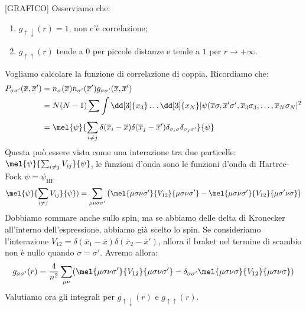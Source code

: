 [GRAFICO]
Osserviamo che:
\begin{enumerate}
    \item $g_{\uparrow\downarrow}(r)=1$, non c'è correlazione;
    \item $g_{\uparrow\uparrow}(r)$ tende a $0$ per piccole distanze e tende a $1$ per $r\rightarrow+\infty$.
\end{enumerate}
Vogliamo calcolare la funzione di correlazione di coppia. Ricordiamo che:
\begin{equation*}
    \begin{aligned}
    P_{\sigma\sigma'}(\overline x, \overline{x}') &= n_\sigma(\overline x)n_{\sigma'}(\overline{x}')g_{\sigma\sigma'}(\overline x, \overline{x}') \\
    & = N(N-1)\sum_{}\int \dd[3]{x_3}\dots\dd[3]{x_N}|\psi(\overline x \sigma, \overline{x}'\sigma', \overline{x}_3\sigma_3,\dots,\overline{x}_N\sigma_N|^2 \\
    & = \mel{\psi}{\sum_{i\neq j}\delta(\overline{x}_i-\overline{x})\delta(\overline{x}_j-\overline{x}')\delta_{\sigma_i\sigma}\delta_{\sigma_j\sigma'}}{\psi}
    \end{aligned}
\end{equation*}
Questa può essere vista come una interazione tra due particelle: $\mel{\psi}{\sum_{i\neq j}V_{ij}}{\psi}$, le funzioni d'onda sono le funzioni d'onda di Hartree-Fock $\psi=\psi_{\text{HF}}$
\begin{equation*}
    \mel{\psi}{\sum_{i\neq j}V_{ij}}{\psi})=\sum_{\mu\nu\sigma\sigma'}\big(\mel{\mu\sigma\nu\sigma'}{V_{12}}{\mu\sigma\nu\sigma'}-\mel{\mu\sigma\nu\sigma'}{V_{12}}{\mu\sigma'\nu\sigma}\big)
\end{equation*}
Dobbiamo sommare anche sullo spin, ma se abbiamo delle delta di Kronecker all'interno dell'espressione, abbiamo già scelto lo spin.
Se consideriamo l'interazione $V_{12}=\delta(\overline{x}_1-\overline x)\delta(\overline{x}_2-\overline{x}')$, allora il braket nel termine di scambio non è nullo quando $\sigma=\sigma'$.
Avremo allora:
\begin{equation*}
    g_{\sigma\sigma'}(r)=\frac{4}{n^2}\sum_{\mu\nu}(\mel{\mu\sigma\nu\sigma'}{V_{12}}{\mu\sigma\nu\sigma'}-\delta_{\sigma\sigma'}\mel{\mu\sigma\nu\sigma}{V_{12}}{\mu\sigma\nu\sigma})
\end{equation*}
Valutiamo ora gli integrali per $g_{\uparrow\downarrow}(r)$ e $g_{\uparrow\uparrow}(r)$.
